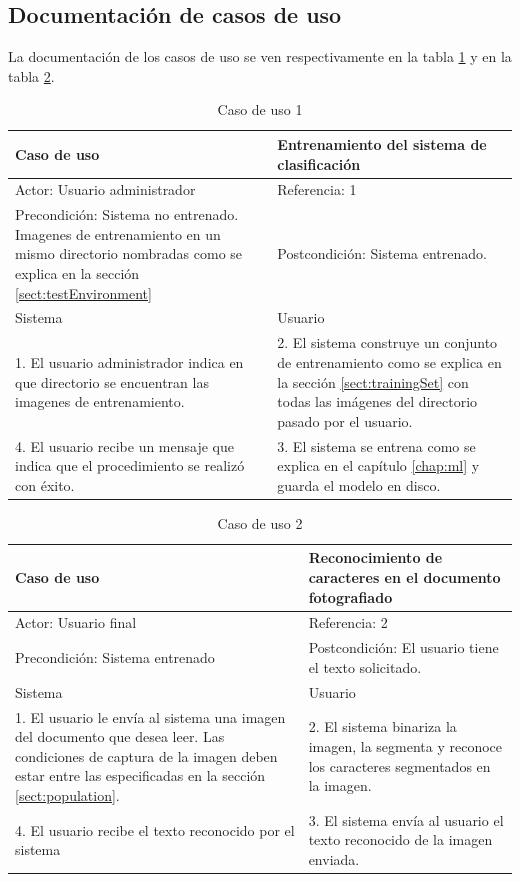 \documentclass[a4paper, 11pt, oneside]{report}
\begin{document}
\subsection{Documentación de casos de uso}

La documentación de los casos de uso se ven respectivamente en la tabla \ref{tb:uc1} y en la tabla \ref{tb:uc2}.

\begin{table}
\begin{center}
\begin{tabular}{|p{6cm}|p{6cm}|}
	\hline
	Caso de uso & Entrenamiento del sistema de clasificación\\
	\hline
	Actor: Usuario administrador & Referencia: 1 \\
	\hline
	Precondición: Sistema no entrenado. Imagenes de entrenamiento en un mismo directorio nombradas como se explica en la sección \ref{sect:testEnvironment} & 
	Postcondición: Sistema entrenado. \\
	\hline
	Sistema & Usuario \\
	\hline
	1. El usuario administrador indica en que directorio se encuentran las imagenes de entrenamiento. &
	2. El sistema construye un conjunto de entrenamiento como se explica en la sección \ref{sect:trainingSet} con todas las imágenes del directorio pasado por el usuario. \\
	\hline
	4. El usuario recibe un mensaje que indica que el procedimiento se realizó c\label{eq:hu}on éxito. &
	3. El sistema se entrena como se explica en el capítulo \ref{chap:ml} y guarda el modelo en disco. \\
	\hline
\end{tabular}
\end{center}
\caption{Caso de uso 1}	
\label{tb:uc1}
\end{table}

\begin{table}
\begin{center}
\begin{tabular}{|p{6cm}|p{6cm}|}
	\hline
	Caso de uso & Reconocimiento de caracteres en el documento fotografiado\\
	\hline
	Actor: Usuario final & Referencia: 2 \\
	\hline
	Precondición: Sistema entrenado & Postcondición: El usuario tiene el texto solicitado. \\
	\hline
	Sistema & Usuario \\
	\hline
	1. El usuario le envía al sistema una imagen del documento que desea leer. Las condiciones de captura de la imagen deben estar entre las especificadas en la sección \ref{sect:population}. &
	2. El sistema binariza la imagen, la segmenta y reconoce los caracteres segmentados en la imagen. \\
	\hline
	4. El usuario recibe el texto reconocido por el sistema &
	3. El sistema envía al usuario el texto reconocido de la imagen enviada. \\
	\hline
\end{tabular}
\end{center}
\caption{Caso de uso 2}	
\label{tb:uc2}
\end{table}
\end{document}
